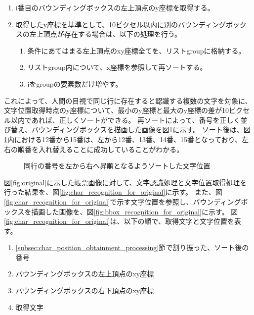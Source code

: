 \begin{enumerate}
    \item i番目のバウンディングボックスの左上頂点のy座標を取得する。
    \item 取得したy座標を基準として、10ピクセル以内に別のバウンディングボックスの左上頂点が存在する場合は、以下の処理を行う。
    \begin{enumerate}
        \item 条件にあてはまる左上頂点のxy座標全てを、リストgroupに格納する。
        \item リストgroup内について、x座標を参照して再ソートする。
        \item iをgroupの要素数だけ増やす。
    \end{enumerate}
\end{enumerate}

これによって、人間の目視で同じ行に存在すると認識する複数の文字を対象に、文字位置取得時点のy座標について、最小のy座標と最大のy座標の差が10ピクセル以内であれば、正しくソートができる。
再ソートによって、番号を正しく並び替え、バウンディングボックスを描画した画像を図\ref{fig:after_sorted_string}に示す。
ソート後は、図\ref{fig:after_sorted_string}内における12番から15番は、左から12番、13番、14番、15番となっており、左右の順番を入れ替えることに成功していることがわかる。

\begin{figure}[t]
    \begin{center}
        \caption{同行の番号を左から右へ昇順となるようソートした文字位置}
        \label{fig:after_sorted_string}
    \end{center}
\end{figure}

図\ref{fig:original}に示した帳票画像に対して、文字認識処理と文字位置取得処理を行った結果を、図\ref{fig:char_recognition_for_original}に示す。
また、図\ref{fig:char_recognition_for_original}で示す文字位置を参照し、バウンディングボックスを描画した画像を、図\ref{fig:bbox_recognition_for_original}に示す。
図\ref{fig:char_recognition_for_original}は、以下の順で、取得文字と文字位置を表す。

\begin{enumerate}
    \item \ref{subsec:char_position_obtainment_processing}節で割り振った、ソート後の番号
    \item バウンディングボックスの左上頂点のxy座標
    \item バウンディングボックスの右下頂点のxy座標
    \item 取得文字
\end{enumerate}

